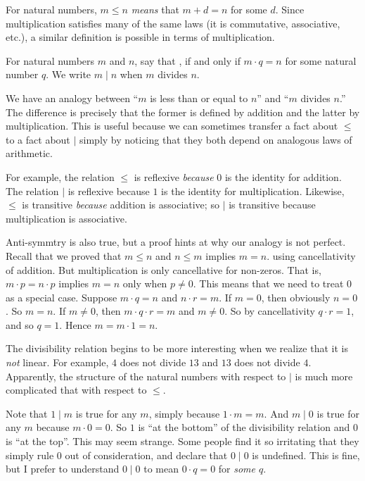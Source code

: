 For natural numbers, $m\leq n$ \emph{means} that $m+d = n$ for some $d$.
Since multiplication satisfies many of the same laws (it is commutative, associative, etc.), a similar definition is possible in terms of multiplication.

\begin{defn}
  For natural numbers $m$ and $n$, say that , if and only if $m\cdot q = n$ for some natural
  number $q$.
  We write $m\mid n$ when $m$ divides $n$.
\end{defn}

We have an analogy between ``$m$ is less than  or equal to $n$'' and ``$m$ divides $n$.'' 
The difference is precisely that the former is defined by addition and the latter by multiplication.
This is useful because we can sometimes transfer a fact about $\leq$ to a fact about $\mid$ simply by noticing that they both depend on analogous laws of arithmetic.

For example, the relation $\leq$ is reflexive \emph{because} $0$ is the identity for addition.
The relation $\mid$ is reflexive because $1$ is the identity for multiplication.
Likewise, $\leq$ is transitive \emph{because} addition is associative; 
so $\mid$ is transitive because multiplication is associative. 

Anti-symmtry is also true, but a proof hints at why our analogy is not perfect. 
Recall that we proved that $m\leq n$ and $n\leq m$ implies $m=n$. using cancellativity of addition.
But multiplication is only cancellative for non-zeros.
That is, $m\cdot p = n\cdot p$ implies $m=n$ only when $p\neq 0$. 
This means that we need to treat $0$ as a special case. 
Suppose $m\cdot q = n$ and $n\cdot r = m$. If $m=0$, then obviously $n=0$.
So $m=n$.
If $m\neq 0$, then $m\cdot q\cdot r = m$ and $m\neq 0$.
So by cancellativity $q\cdot r = 1$, and so $q=1$. 
Hence $m = m\cdot 1 = n$.

The divisibility relation begins to be more interesting
when we realize that it is \emph{not} linear. For example,
$4$ does not divide $13$ and $13$ does not divide $4$.
Apparently, the structure of the natural numbers with respect
to $\mid$ is much more complicated that with respect to $\leq$.

Note that $1\mid m$ is true for any $m$, simply because $1\cdot m = m$.
And $m\mid 0$ is true for any $m$ because $m\cdot 0 = 0$.
So $1$ is ``at the bottom'' of the divisibility relation and $0$ is  ``at the top''. 
This may seem strange. Some people find it so irritating that they simply rule $0$ out of consideration, and declare that $0\mid 0$ is undefined. 
This is fine, but
I prefer to understand $0\mid 0$ to mean $0 \cdot q = 0$ for \emph{some $q$}.

